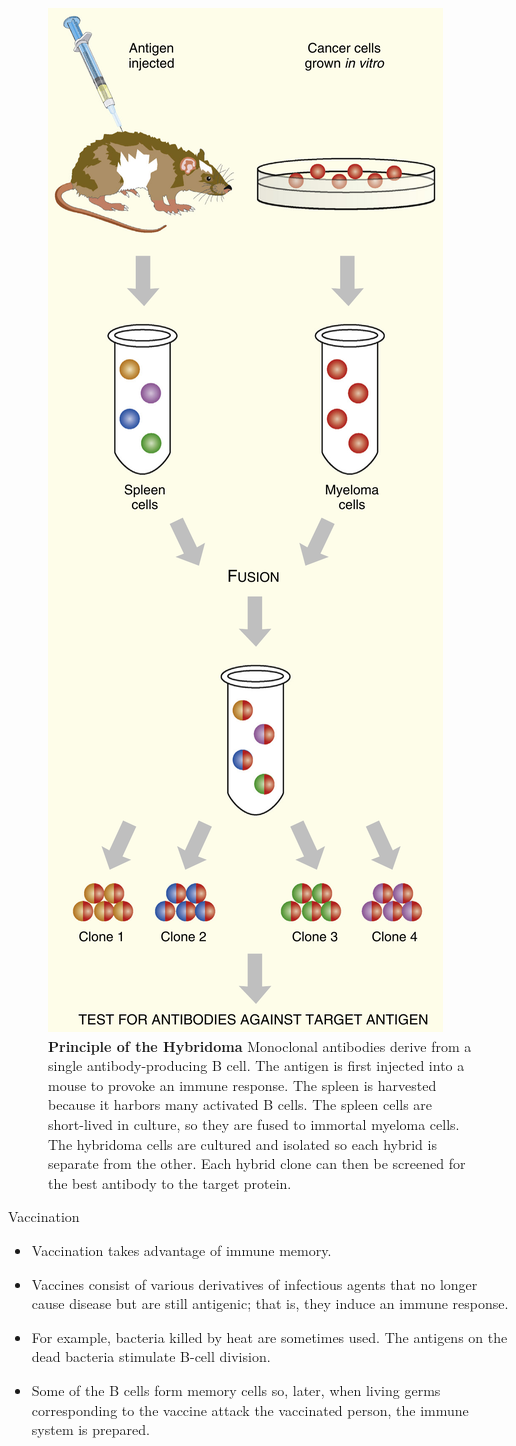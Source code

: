\documentclass[11pt,dvipsnames,ignorenonframetext,aspectratio=169]{beamer}
\providecommand{\tightlist}{%
  \setlength{\itemsep}{0pt}\setlength{\parskip}{0pt}}
\begin{document}
\begin{frame}{}
\protect\hypertarget{section-15}{}

\begin{figure}
\begin{columns}[T,onlytextwidth]
\begin{center}
\includegraphics[width=0.28\linewidth]{./../images/hybridoma_principle.png}
\end{center}
\caption{\newline \textbf{Principle of the Hybridoma} \newline Monoclonal antibodies derive from a single antibody-producing B cell. The antigen is first injected into a mouse to provoke an immune response. The spleen is harvested because it harbors many activated B cells. The spleen cells are short-lived in culture, so they are fused to immortal myeloma cells. The hybridoma cells are cultured and isolated so each hybrid is separate from the other. Each hybrid clone can then be screened for the best antibody to the target protein.}
\label{fig:monoclonal-antibody-hybridoma}
\end{columns}
\end{figure}

\end{frame}

\begin{frame}{Vaccination}
\protect\hypertarget{vaccination}{}

\begin{itemize}
\tightlist
\item
  Vaccination takes advantage of immune memory.
\item
  Vaccines consist of various derivatives of infectious agents that no
  longer cause disease but are still antigenic; that is, they induce an
  immune response.
\item
  For example, bacteria killed by heat are sometimes used. The antigens
  on the dead bacteria stimulate B-cell division.
\item
  Some of the B cells form memory cells so, later, when living germs
  corresponding to the vaccine attack the vaccinated person, the immune
  system is prepared.
\end{itemize}

\end{frame}
\end{document}
